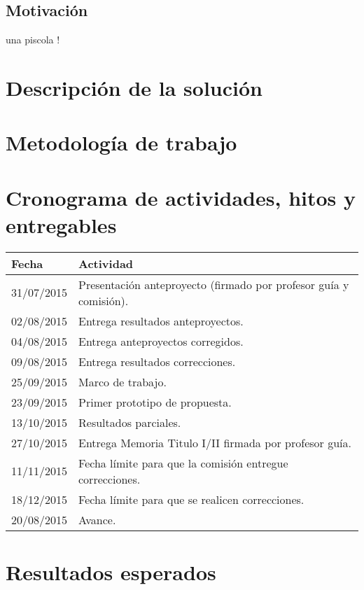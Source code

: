\documentclass{udparticle}
\begin{document}
 




\subsection{Motivación}

  una piscola !
 

\section{Descripción de la solución}
 

\section{Metodología de trabajo}
 
 


\section{Cronograma de actividades, hitos y entregables}
  \begin{tabular}{ll}
  \hline\noalign{\smallskip}
  Fecha & Actividad \\
  \hline\noalign{\smallskip}
  31/07/2015 & Presentación anteproyecto (firmado por profesor guía y comisión).\\

  02/08/2015 & Entrega resultados anteproyectos.\\

  04/08/2015 & Entrega anteproyectos corregidos.\\

  09/08/2015 &  Entrega resultados correcciones.\\

  25/09/2015 & Marco de trabajo.\\

  23/09/2015 & Primer prototipo de propuesta.\\

  13/10/2015 & Resultados parciales.\\

  27/10/2015 & Entrega Memoria Titulo I/II firmada por profesor guía.\\

  11/11/2015 & Fecha límite para que la comisión entregue correcciones.\\

  18/12/2015 & Fecha límite para que se realicen correcciones.\\

  20/08/2015 & Avance.\\

  \hline

  \end{tabular}


\section{Resultados esperados}
  
% 


\nocite{*}
\end{document}
